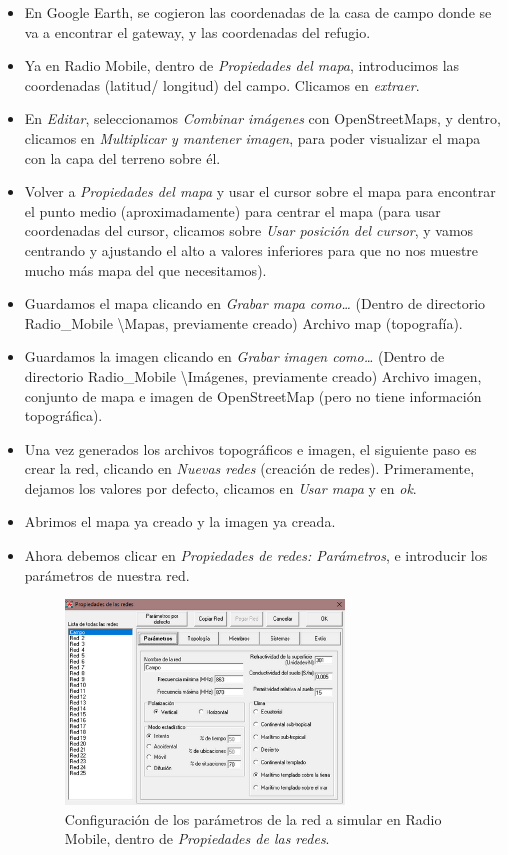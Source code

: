 \documentclass[12pt]{article}
\begin{document}
	\begin{itemize}
		\item En Google Earth, se cogieron las coordenadas de la casa de campo donde se va a encontrar el gateway, y las coordenadas del refugio.
		\item Ya en Radio Mobile, dentro de \textit{Propiedades del mapa}, introducimos las coordenadas (latitud/ longitud) del campo. Clicamos en \textit{extraer}.
		\item En \textit{Editar}, seleccionamos \textit{Combinar imágenes} con OpenStreetMaps, y dentro, clicamos en \textit{Multiplicar y mantener imagen}, para poder visualizar el mapa con la capa del terreno sobre él. 
		\item Volver a \textit{Propiedades del mapa} y usar el cursor sobre el mapa para encontrar el punto medio (aproximadamente) para centrar el mapa (para usar coordenadas del cursor, clicamos sobre \textit{Usar posición del cursor}, y vamos centrando y ajustando el alto a valores inferiores para que no nos muestre mucho más mapa del que necesitamos).
		\item Guardamos el mapa clicando en \textit{Grabar mapa como…} (Dentro de directorio Radio\_Mobile \textbackslash Mapas, previamente creado) Archivo map (topografía).
		\item Guardamos la imagen clicando en \textit{Grabar imagen como…}  (Dentro de directorio Radio\_Mobile \textbackslash Imágenes, previamente creado) Archivo imagen, conjunto de mapa e imagen de OpenStreetMap (pero no tiene información topográfica).
		\item Una vez generados los archivos topográficos e imagen, el siguiente paso es crear la red, clicando en \textit{Nuevas redes} (creación de redes). Primeramente, dejamos los valores por defecto, clicamos en \textit{Usar mapa} y en \textit{ok}.
		\item Abrimos el mapa ya creado y la imagen ya creada.
		\item Ahora debemos clicar en \textit{Propiedades de redes: Parámetros}, e introducir los parámetros de nuestra red.
		
		\begin{figure}[h]
			\begin{center}
				\includegraphics[width=0.7\textwidth]{img/prop_redes_radiomobile.png}
				\caption{Configuración de los parámetros de la red a simular en Radio Mobile, dentro de \textit{Propiedades de las redes}.}
				\label{Prop redes param radiomobile}
			\end{center}
		\end{figure}
		

\end{itemize}
\end{document}

